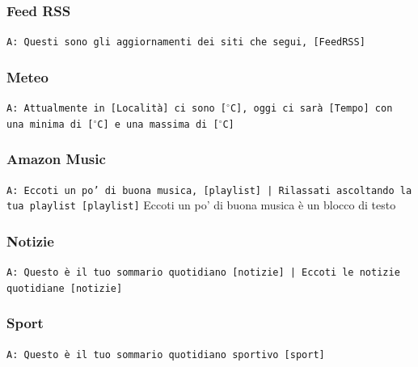 \subsubsection{Feed RSS}
\texttt{A: Questi sono gli aggiornamenti dei siti che segui, [FeedRSS]}

\subsubsection{Meteo}
\texttt{A: Attualmente in [Località] ci sono [$^\circ$C], oggi ci sarà [Tempo] con una minima di [$^\circ$C] e una massima di [$^\circ$C]}

\subsubsection{Amazon Music}
\texttt{A: Eccoti un po' di buona musica, [playlist] | Rilassati ascoltando la tua playlist [playlist]} 
Eccoti un po' di buona musica è un blocco di testo
\subsubsection{Notizie}
\texttt{A: Questo è il tuo sommario quotidiano [notizie] | Eccoti le notizie quotidiane [notizie]}

\subsubsection{Sport}
\texttt{A: Questo è il tuo sommario quotidiano sportivo [sport]}

